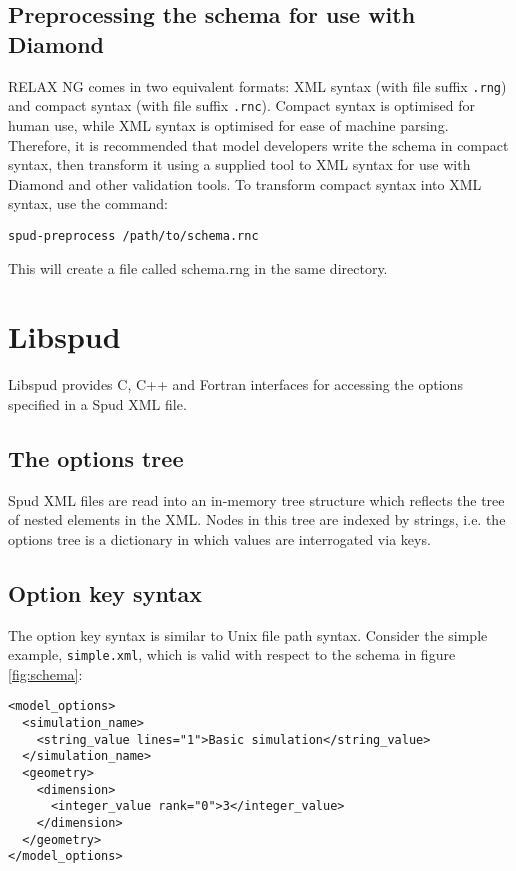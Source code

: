 \documentclass[a4paper, 11pt]{book}
\begin{document}
\section{Preprocessing the schema for use with Diamond}
RELAX NG comes in two equivalent formats: XML syntax (with
file suffix \verb+.rng+) and compact
syntax (with file suffix \verb+.rnc+).
Compact syntax is optimised for human use, while XML
syntax is optimised for ease of machine parsing. Therefore,
it is recommended that model developers write the schema
in compact syntax, then transform it using a supplied tool
to XML syntax for use with Diamond and other validation tools.
To transform compact syntax into XML syntax, use the command:
\begin{verbatim}
spud-preprocess /path/to/schema.rnc
\end{verbatim}
This will create a file called schema.rng in the same directory.

\chapter{Libspud}

Libspud provides C, C++ and Fortran interfaces for accessing the options
specified in a Spud XML file.

\section{The options tree}

Spud XML files are read into an in-memory tree structure which reflects the
tree of nested elements in the XML. Nodes in this tree are indexed by
strings, i.e. the options tree is a dictionary in which values are
interrogated via keys.

\section{Option key syntax}

The option key syntax is similar to Unix file path syntax.
Consider the simple example, \verb+simple.xml+, which is valid with respect
to the schema in figure \ref{fig:schema}:
\begin{verbatim}
<model_options>
  <simulation_name>
    <string_value lines="1">Basic simulation</string_value>
  </simulation_name>
  <geometry>
    <dimension>
      <integer_value rank="0">3</integer_value>
    </dimension>
  </geometry>
</model_options>
\end{verbatim}
\end{document}
